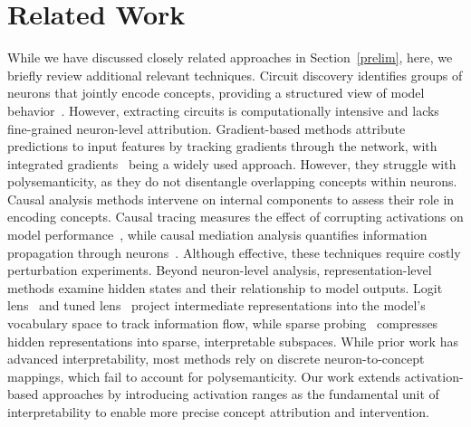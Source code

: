 \section{Related Work}
While we have discussed closely related approaches in Section~\ref{prelim}, here, we briefly review additional relevant techniques.
Circuit discovery identifies groups of neurons that jointly encode concepts, providing a structured view of model behavior~\citep{marks2024sparse, ConmyMLHG23, olah2020zoom}. However, extracting circuits is computationally intensive and lacks fine-grained neuron-level attribution.
Gradient-based methods attribute predictions to input features by tracking gradients through the network, with integrated gradients~\citep{sundararajan2017axiomaticattributiondeepnetworks,dai2021knowledge} being a widely used approach. However, they struggle with polysemanticity, as they do not disentangle overlapping concepts within neurons.
Causal analysis methods intervene on internal components to assess their role in encoding concepts. Causal tracing measures the effect of corrupting activations on model performance~\citep{vig2020investigating, meng2022locating}, while causal mediation analysis quantifies information propagation through neurons~\citep{vig2020investigating}. Although effective, these techniques require costly perturbation experiments.
Beyond neuron-level analysis, representation-level methods examine hidden states and their relationship to model outputs. Logit lens~\citep{logitlens} and tuned lens~\citep{belrose2023elicitinglatentpredictionstransformers} project intermediate representations into the model’s vocabulary space to track information flow, while sparse probing~\citep{gurnee2023findingneuronshaystackcase} compresses hidden representations into sparse, interpretable subspaces.
While prior work has advanced interpretability, most methods rely on discrete neuron-to-concept mappings, which fail to account for polysemanticity. Our work extends activation-based approaches by introducing activation ranges as the fundamental unit of interpretability to enable more precise concept attribution and intervention.



